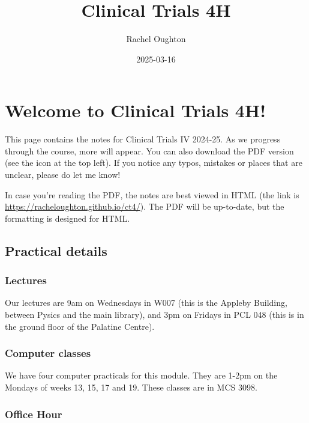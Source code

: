 \documentclass[
  openany]{book}
\title{Clinical Trials 4H}
\author{Rachel Oughton}
\date{2025-03-16}
\theoremstyle{definition}
\theoremstyle{definition}
\theoremstyle{definition}
\theoremstyle{definition}
\theoremstyle{remark}
\begin{document}
\maketitle

{
\setcounter{tocdepth}{1}
\tableofcontents
}
\chapter*{Welcome to Clinical Trials 4H!}\label{welcome-to-clinical-trials-4h}

This page contains the notes for Clinical Trials IV 2024-25. As we progress through the course, more will appear. You can also download the PDF version (see the icon at the top left). If you notice any typos, mistakes or places that are unclear, please do let me know!

In case you're reading the PDF, the notes are best viewed in HTML (the link is \url{https://racheloughton.github.io/ct4/}). The PDF will be up-to-date, but the formatting is designed for HTML.

\section*{Practical details}\label{practical-details}

\subsection*{Lectures}\label{lectures}

Our lectures are 9am on Wednesdays in W007 (this is the Appleby Building, between Pysics and the main library), and 3pm on Fridays in PCL 048 (this is in the ground floor of the Palatine Centre).

\subsection*{Computer classes}\label{computer-classes}

We have four computer practicals for this module. They are 1-2pm on the Mondays of weeks 13, 15, 17 and 19. These classes are in MCS 3098.

\subsection*{Office Hour}\label{office-hour}
\end{document}
